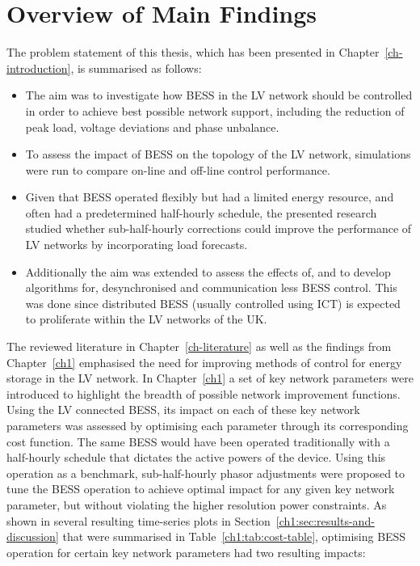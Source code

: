 \section{Overview of Main Findings}
\label{ch-conclusions:sec:main-findings}

The problem statement of this thesis, which has been presented in Chapter~\ref{ch-introduction}, is summarised as follows:

\begin{itemize}
	\item
	The aim was to investigate how BESS in the LV network should be controlled in order to achieve best possible network support, including the reduction of peak load, voltage deviations and phase unbalance.
	\item 
	To assess the impact of BESS on the topology of the LV network, simulations were run to compare on-line and off-line control performance.
	\item
	Given that BESS operated flexibly but had a limited energy resource, and often had a predetermined half-hourly schedule, the presented research studied whether sub-half-hourly corrections could improve the performance of LV networks by incorporating load forecasts.
	\item
	Additionally the aim was extended to assess the effects of, and to develop algorithms for, desynchronised and communication less BESS control.
	This was done since distributed BESS (usually controlled using ICT) is expected to proliferate within the LV networks of the UK.
\end{itemize}

The reviewed literature in Chapter~\ref{ch-literature} as well as the findings from Chapter~\ref{ch1} emphasised the need for improving methods of control for energy storage in the LV network.
In Chapter~\ref{ch1} a set of key network parameters were introduced to highlight the breadth of possible network improvement functions.
Using the LV connected BESS, its impact on each of these key network parameters was assessed by optimising each parameter through its corresponding cost function.
The same BESS would have been operated traditionally with a half-hourly schedule that dictates the active powers of the device.
Using this operation as a benchmark, sub-half-hourly phasor adjustments were proposed to tune the BESS operation to achieve optimal impact for any given key network parameter, but without violating the higher resolution power constraints.
As shown in several resulting time-series plots in Section~\ref{ch1:sec:results-and-discussion} that were summarised in Table~\ref{ch1:tab:cost-table}, optimising BESS operation for certain key network parameters had two resulting impacts:

